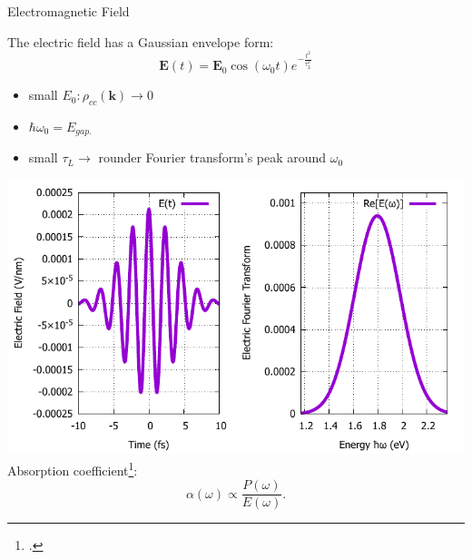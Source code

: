 \documentclass{beamer}
\begin{document}
\begin{frame}{Electromagnetic Field}
	\begin{multicols}{2}
		The electric field has a Gaussian envelope form:
		\begin{equation}
			\textbf{E}(t) = \textbf{E}_0 \cos(\omega_0 t)e^{-\frac{t^2}{\tau_L^2}}
		\end{equation}
		\begin{itemize}
			\item small $E_0: \rho_{cc}(\textbf{k}) \to 0$
			\item $\hbar \omega_0 = E_{gap.}$
			\item small $\tau_L \to $ rounder Fourier transform's peak around $\omega_0$
		\end{itemize}
		\columnbreak
		\includegraphics[width=1\linewidth]{images/Eat.pdf}
		Absorption coefficient\footcite{haug_quantum_2009}:
		\begin{equation}
			\alpha(\omega) \propto \frac{P(\omega)}{E(\omega)}.
		\end{equation}
	\end{multicols}
\end{frame}
\end{document}

